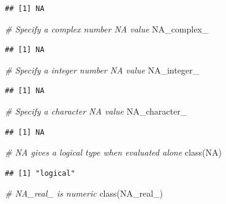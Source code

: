 \documentclass[
]{book}
\newenvironment{Shaded}{\begin{snugshade}}{\end{snugshade}}
\newcommand{\CommentTok}[1]{\textcolor[rgb]{0.56,0.35,0.01}{\textit{#1}}}
\newcommand{\ConstantTok}[1]{\textcolor[rgb]{0.00,0.00,0.00}{#1}}
\newcommand{\FunctionTok}[1]{\textcolor[rgb]{0.00,0.00,0.00}{#1}}
\newcommand{\NormalTok}[1]{#1}
\begin{document}
\begin{verbatim}
## [1] NA
\end{verbatim}

\begin{Shaded}
\begin{Highlighting}[]
\CommentTok{\# Specify a complex number NA value}
\ConstantTok{NA\_complex\_}
\end{Highlighting}
\end{Shaded}

\begin{verbatim}
## [1] NA
\end{verbatim}

\begin{Shaded}
\begin{Highlighting}[]
\CommentTok{\# Specify a integer number NA value}
\ConstantTok{NA\_integer\_}
\end{Highlighting}
\end{Shaded}

\begin{verbatim}
## [1] NA
\end{verbatim}

\begin{Shaded}
\begin{Highlighting}[]
\CommentTok{\# Specify a character NA value}
\ConstantTok{NA\_character\_}
\end{Highlighting}
\end{Shaded}

\begin{verbatim}
## [1] NA
\end{verbatim}

\begin{Shaded}
\begin{Highlighting}[]
\CommentTok{\# NA gives a logical type when evaluated alone}
\FunctionTok{class}\NormalTok{(}\ConstantTok{NA}\NormalTok{)}
\end{Highlighting}
\end{Shaded}

\begin{verbatim}
## [1] "logical"
\end{verbatim}

\begin{Shaded}
\begin{Highlighting}[]
\CommentTok{\# NA\_real\_ is numeric}
\FunctionTok{class}\NormalTok{(}\ConstantTok{NA\_real\_}\NormalTok{)}
\end{Highlighting}
\end{Shaded}
\end{document}
